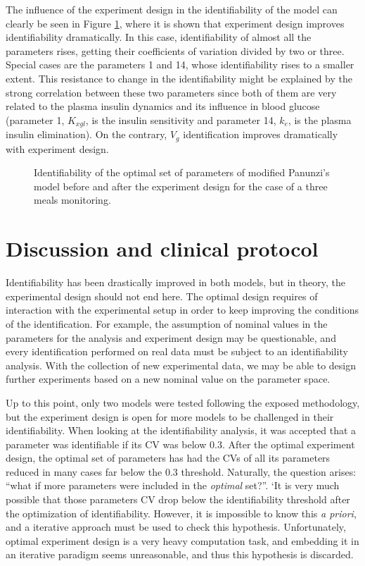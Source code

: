 The influence of the experiment design in the identifiability of the model can clearly be seen in Figure \ref{fig:panunzi1optdesign3days}, where it is shown that experiment design improves identifiability dramatically. In this case, identifiability of almost all the parameters rises, getting their coefficients of variation divided by two or three. Special cases are the parameters 1 and 14, whose identifiability rises to a smaller extent. This resistance to change in the identifiability might be explained by the strong correlation between these two parameters since both of them are very related to the plasma insulin dynamics and its influence in blood glucose (parameter 1, $K_{xgl}$, is the insulin sensitivity and parameter 14, $k_{e}$, is the plasma insulin elimination). On the contrary, $V_g$ identification improves dramatically with experiment design.

\begin{figure}[hbt]
\centering
{}\caption{Identifiability of the optimal set of parameters of modified Panunzi's model before and after the experiment design for the case of a three meals monitoring.}
\label{fig:panunzi1optdesign3days}
\end{figure}

\section{Discussion and clinical protocol}
\label{sec:DiscussionAndProtocol}

Identifiability has been drastically improved in both models, but in theory, the experimental design should not end here. The optimal design requires of interaction with the experimental setup in order to keep improving the conditions of the identification. For example, the assumption of nominal values in the parameters for the analysis and experiment design may be questionable, and every identification performed on real data must be subject to an identifiability analysis. With the collection of new experimental data, we may be able to design further experiments based on a new nominal value on the parameter space.

Up to this point, only two models were tested following the exposed methodology, but the experiment design is open for more models to be challenged in their identifiability. When looking at the identifiability analysis, it was accepted that a parameter was identifiable if its CV was below 0.3. After the optimal experiment design, the optimal set of parameters has had the CVs of all its parameters reduced in many cases far below the 0.3 threshold. Naturally, the question arises: ``what if more parameters were included in the \textit{optimal} set?''. `It is very much possible that those parameters CV drop below the identifiability threshold after the optimization of identifiability. However, it is impossible to know this \textit{a priori}, and a iterative approach must be used to check this hypothesis. Unfortunately, optimal experiment design is a very heavy computation task, and embedding it in an iterative paradigm seems unreasonable, and thus this hypothesis is discarded.

